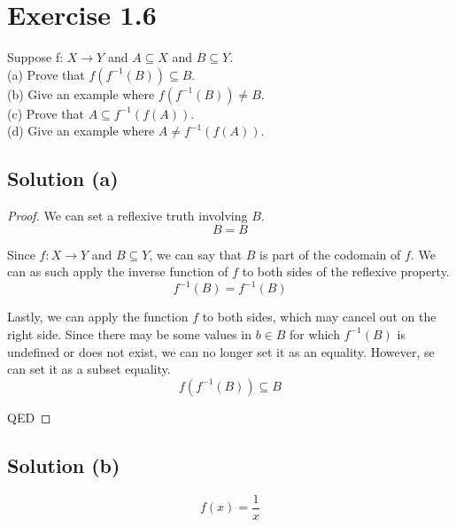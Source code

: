 \documentclass[12pt]{report}
\begin{document}
\pagebreak
\section{Exercise 1.6}
Suppose f: $X \rightarrow Y$ and $A \subseteq X$ and $B \subseteq Y$.\\
(a) Prove that $f(f^{-1}(B)) \subseteq B$.\\
(b) Give an example where $f(f^{-1}(B)) \neq B$.\\
(c) Prove that $A \subseteq f^{-1}(f(A))$.\\
(d) Give an example where $A \neq f^{-1}(f(A))$.

\subsection{Solution (a)}
\begin{proof}
    We can set a reflexive truth involving $B$.
    \begin{equation}
        B = B
    \end{equation}

    Since $f: X \rightarrow Y$ and $B \subseteq Y$, we can say that $B$ is part of the codomain of $f$.
    We can as such apply the inverse function of $f$ to both sides of the reflexive property.
    \begin{equation}
        f^{-1}(B) = f^{-1}(B)
    \end{equation}

    Lastly, we can apply the function $f$ to both sides, which may cancel out on the right side. 
    Since there may be some values in $b \in B$ for which $f^{-1}(B)$ is undefined or does not exist, we can no longer set it as an equality. However, se can set it as a subset equality.
    \begin{equation}
        f(f^{-1}(B)) \subseteq B
    \end{equation}

    QED
\end{proof}

\subsection{Solution (b)}
\begin{equation}
    f(x) = \frac{1}{x}
\end{equation}

\pagebreak
\end{document}
